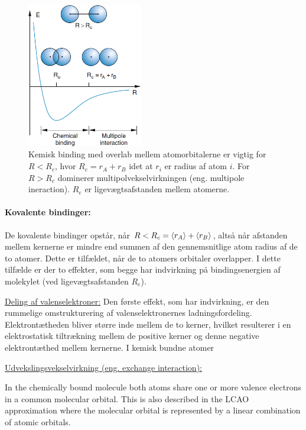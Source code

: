 \begin{figure}[!h]
    \centering
    \includegraphics[width=0.45\textwidth]{Q19/images/ReasonsForBinding.PNG}
    \caption{Kemisk binding med overlab mellem atomorbitalerne er vigtig for $R < R_c$, hvor $R_c = r_A + r_B$ idet at $r_i$ er radius af atom $i$. For $R > R_c$ dominerer multipolvekselvirkningen (eng. multipole ineraction). $R_e$ er ligevægtsafstanden mellem atomerne.}
    \label{fig:Q19_ReasonsForMolecularBinding}
\end{figure}


\paragraph{Kovalente bindinger:} De kovalente bindinger opstår, når $R < R_c = \Braket{r_A} + \Braket{r_B}$, altså når afstanden mellem kernerne er mindre end summen af den gennemsnitlige atom radius af de to atomer. Dette er tilfældet, når de to atomers orbitaler overlapper. I dette tilfælde er der to effekter, som begge har indvirkning på bindingsenergien af molekylet (ved ligevægtsafstanden $R_e$).

\underline{Deling af valenselektroner:} Den første effekt, som har indvirkning, er den rummelige omstrukturering af valenselektronernes ladningsfordeling. Elektrontætheden bliver større inde mellem de to kerner, hvilket resulterer i en elektrostatisk tiltrækning mellem de positive kerner og denne negative elektrontæthed mellem kernerne. I kemisk bundne atomer

\underline{Udvekslingsvekselvirkning (eng. exchange interaction):}





In the chemically
bound molecule both atoms share one or more valence
electrons in a common molecular orbital. This is also
described in the LCAO approximation where the
molecular orbital is represented by a linear combination
of atomic orbitals.


